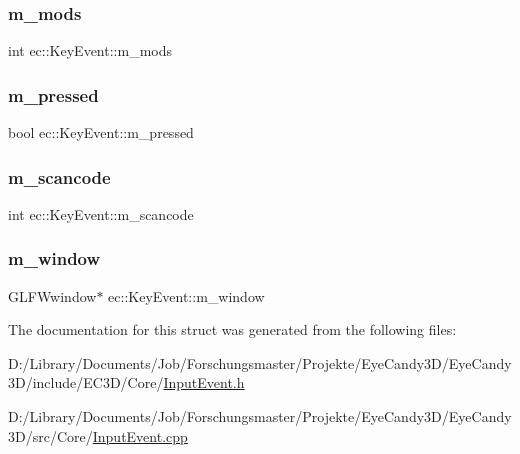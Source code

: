 \subsubsection{\texorpdfstring{m\+\_\+mods}{m\_mods}}
{\footnotesize\ttfamily int ec\+::\+Key\+Event\+::m\+\_\+mods}

\mbox{\label{structec_1_1_key_event_a4e9ab83e1535c1ee34c9eb54c21b05e3}} 
\subsubsection{\texorpdfstring{m\+\_\+pressed}{m\_pressed}}
{\footnotesize\ttfamily bool ec\+::\+Key\+Event\+::m\+\_\+pressed}

\mbox{\label{structec_1_1_key_event_ac7d1cc5ce7aad43f0aa73879677ad375}} 
\subsubsection{\texorpdfstring{m\+\_\+scancode}{m\_scancode}}
{\footnotesize\ttfamily int ec\+::\+Key\+Event\+::m\+\_\+scancode}

\mbox{\label{structec_1_1_key_event_a334f32a8102f1d155a6fec87375efd04}} 
\subsubsection{\texorpdfstring{m\+\_\+window}{m\_window}}
{\footnotesize\ttfamily G\+L\+F\+Wwindow$\ast$ ec\+::\+Key\+Event\+::m\+\_\+window}



The documentation for this struct was generated from the following files\+:\begin{DoxyCompactItemize}
\item 
D\+:/\+Library/\+Documents/\+Job/\+Forschungsmaster/\+Projekte/\+Eye\+Candy3\+D/\+Eye\+Candy3\+D/include/\+E\+C3\+D/\+Core/\mbox{\hyperlink{_input_event_8h}{Input\+Event.\+h}}\item 
D\+:/\+Library/\+Documents/\+Job/\+Forschungsmaster/\+Projekte/\+Eye\+Candy3\+D/\+Eye\+Candy3\+D/src/\+Core/\mbox{\hyperlink{_input_event_8cpp}{Input\+Event.\+cpp}}\end{DoxyCompactItemize}
